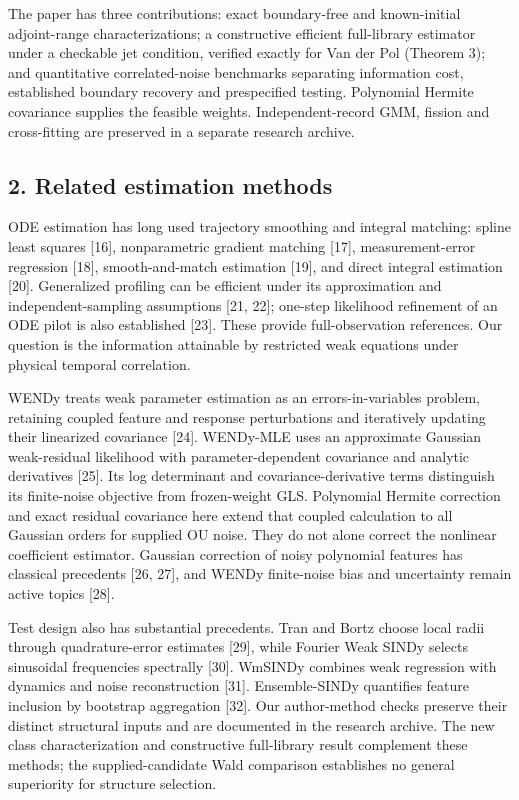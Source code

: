 \documentclass[
  american,
  11pt,
]{article}
\begin{document}
The paper has three contributions: exact boundary-free and known-initial
adjoint-range characterizations; a constructive efficient full-library
estimator under a checkable jet condition, verified exactly for Van der
Pol (Theorem 3); and quantitative correlated-noise benchmarks separating
information cost, established boundary recovery and prespecified
testing. Polynomial Hermite covariance supplies the feasible weights.
Independent-record GMM, fission and cross-fitting are preserved in a
separate research archive.

\subsection{2. Related estimation
methods}\label{related-estimation-methods}

ODE estimation has long used trajectory smoothing and integral matching:
spline least squares {[}16{]}, nonparametric gradient matching {[}17{]},
measurement-error regression {[}18{]}, smooth-and-match estimation
{[}19{]}, and direct integral estimation {[}20{]}. Generalized profiling
can be efficient under its approximation and independent-sampling
assumptions {[}21, 22{]}; one-step likelihood refinement of an ODE pilot
is also established {[}23{]}. These provide full-observation references.
Our question is the information attainable by restricted weak equations
under physical temporal correlation.

WENDy treats weak parameter estimation as an errors-in-variables
problem, retaining coupled feature and response perturbations and
iteratively updating their linearized covariance {[}24{]}. WENDy-MLE
uses an approximate Gaussian weak-residual likelihood with
parameter-dependent covariance and analytic derivatives {[}25{]}. Its
log determinant and covariance-derivative terms distinguish its
finite-noise objective from frozen-weight GLS. Polynomial Hermite
correction and exact residual covariance here extend that coupled
calculation to all Gaussian orders for supplied OU noise. They do not
alone correct the nonlinear coefficient estimator. Gaussian correction
of noisy polynomial features has classical precedents {[}26, 27{]}, and
WENDy finite-noise bias and uncertainty remain active topics {[}28{]}.

Test design also has substantial precedents. Tran and Bortz choose local
radii through quadrature-error estimates {[}29{]}, while Fourier Weak
SINDy selects sinusoidal frequencies spectrally {[}30{]}. WmSINDy
combines weak regression with dynamics and noise reconstruction
{[}31{]}. Ensemble-SINDy quantifies feature inclusion by bootstrap
aggregation {[}32{]}. Our author-method checks preserve their distinct
structural inputs and are documented in the research archive. The new
class characterization and constructive full-library result complement
these methods; the supplied-candidate Wald comparison establishes no
general superiority for structure selection.
\end{document}

